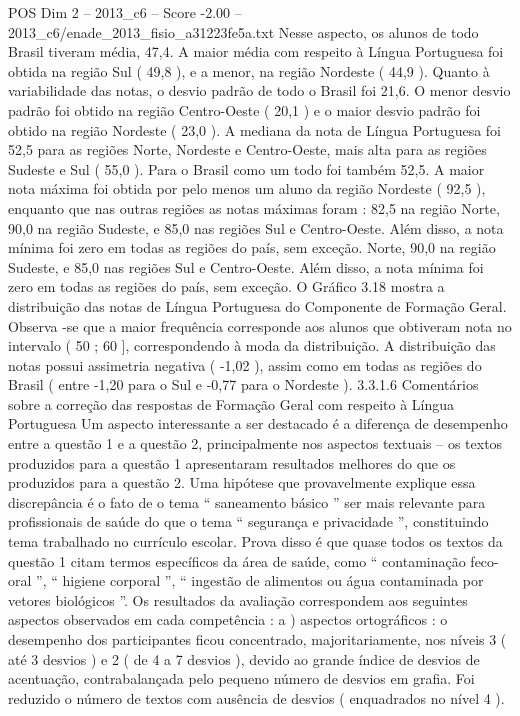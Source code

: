 \begin{textsample}{POS Dim 2 – 2013\_c6 – Score -2.00 – 2013\_c6/enade\_2013\_fisio\_a31223fe5a.txt}
Nesse aspecto, os alunos de todo Brasil tiveram média, 47,4.
A maior média com respeito à Língua Portuguesa foi obtida na região Sul ( 49,8 ), e a menor, na região Nordeste ( 44,9 ).
Quanto à variabilidade das notas, o desvio padrão de todo o Brasil foi 21,6.
O menor desvio padrão foi obtido na região Centro-Oeste ( 20,1 ) e o maior desvio padrão foi obtido na região Nordeste ( 23,0 ).
A mediana da nota de Língua Portuguesa foi 52,5 para as regiões Norte, Nordeste e Centro-Oeste, mais alta para as regiões Sudeste e Sul ( 55,0 ).
Para o Brasil como um todo foi também 52,5.
A maior nota máxima foi obtida por pelo menos um aluno da região Nordeste ( 92,5 ), enquanto que nas outras regiões as notas máximas foram : 82,5 na região Norte, 90,0 na região Sudeste, e 85,0 nas regiões Sul e Centro-Oeste.
Além disso, a nota mínima foi zero em todas as regiões do país, sem exceção.
Norte, 90,0 na região Sudeste, e 85,0 nas regiões Sul e Centro-Oeste.
Além disso, a nota mínima foi zero em todas as regiões do país, sem exceção.
O Gráfico 3.18 mostra a distribuição das notas de Língua Portuguesa do Componente de Formação Geral.
Observa -se que a maior frequência corresponde aos alunos que obtiveram nota no intervalo ( 50 ; 60 ], correspondendo à moda da distribuição.
A distribuição das notas possui assimetria negativa ( -1,02 ), assim como em todas as regiões do Brasil ( entre -1,20 para o Sul e -0,77 para o Nordeste ). 3.3.1.6 Comentários sobre a correção das respostas de Formação Geral com respeito à Língua Portuguesa Um aspecto interessante a ser destacado é a diferença de desempenho entre a questão 1 e a questão 2, principalmente nos aspectos textuais – os textos produzidos para a questão 1 apresentaram resultados melhores do que os produzidos para a questão 2.
Uma hipótese que provavelmente explique essa discrepância é o fato de o tema “ saneamento básico ” ser mais relevante para profissionais de saúde do que o tema “ segurança e privacidade ”, constituindo tema trabalhado no currículo escolar.
Prova disso é que quase todos os textos da questão 1 citam termos específicos da área de saúde, como “ contaminação feco-oral ”, “ higiene corporal ”, “ ingestão de alimentos ou água contaminada por vetores biológicos ”.
Os resultados da avaliação correspondem aos seguintes aspectos observados em cada competência : a ) aspectos ortográficos : o desempenho dos participantes ficou concentrado, majoritariamente, nos níveis 3 ( até 3 desvios ) e 2 ( de 4 a 7 desvios ), devido ao grande índice de desvios de acentuação, contrabalançada pelo pequeno número de desvios em grafia.
Foi reduzido o número de textos com ausência de desvios ( enquadrados no nível 4 ).

\end{textsample}
